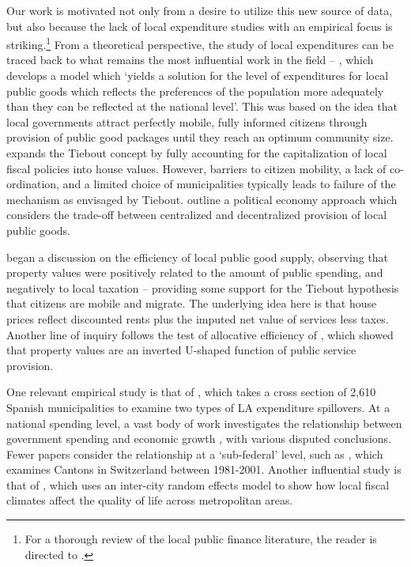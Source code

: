 \documentclass[12pt]{article}
\begin{document}
Our work is motivated not only from a desire to utilize this new source of data, but also because the lack of local expenditure studies with an empirical focus is striking.\footnote{For a thorough review of the local public finance literature, the reader is directed to \cite{Blankart2005}.} From a theoretical perspective, the study of local expenditures can be traced back to what remains the most influential work in the field -- \cite{tiebout1956}, which develops a model which `yields a solution for the level of expenditures for local public goods which reflects the preferences of the population more adequately than they can be reflected at the national level'. This was based on the idea that local governments attract perfectly mobile, fully informed citizens through provision of public good packages until they reach an optimum community size. \cite{yinger1982} expands the Tiebout concept by fully accounting for the capitalization of local fiscal policies into house values. However, barriers to citizen mobility, a lack of co-ordination, and a limited choice of municipalities typically leads to failure of the mechanism as envisaged by Tiebout. \cite{Besley20032611} outline a political economy approach which considers the trade-off between centralized and decentralized provision of local public goods. 

\cite{Oats1969} began a discussion on the efficiency of local public good supply, observing that property values were positively related to the amount of public spending, and negatively to local taxation -- providing some support for the Tiebout hypothesis that citizens are mobile and migrate. The underlying idea here is that house prices reflect discounted rents plus the imputed net value of services less taxes. Another line of inquiry follows the test of allocative efficiency of \cite{Brueckner1982}, which showed that property values are an inverted U-shaped function of public service provision.

One relevant empirical study is that of \cite{SoleOlle2006}, which takes a cross section of 2,610 Spanish municipalities to examine two types of LA expenditure spillovers. At a national spending level, a vast body of work investigates the relationship between government spending and economic growth \citep[such as][]{Barro1991}, with various disputed conclusions. Fewer papers consider the relationship at a `sub-federal' level, such as \cite{Schaltegger2004}, which examines Cantons in Switzerland between 1981-2001. Another influential study is that of \cite{Gyourko1991}, which uses an inter-city random effects model to show how local fiscal climates affect the quality of life across metropolitan areas.
\end{document}
